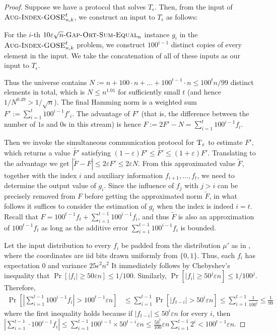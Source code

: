 \documentclass{toc}
\newcommand{\gap}{\ensuremath{\varepsilon}}
\newcommand{\eqdef}{\ensuremath{:=}}
\newcommand{\hest}{ \textsc{T} }
\newcommand{\gose}{\textsc{Gap-Ort-Sum-Equal}}
\newcommand{\auggo}{\textsc{Aug-Index-GOSE}}
\begin{document}
\begin{proof}

{\color{black}Suppose we have a protocol that solves $T_\epsilon$. Then, from the input of $\auggo_{n,k}^t$, we construct an input to $T_\epsilon$ as follows:

For the $i$-th $10\text{$\gap\sqrt{n}$-$\gose_n$}$ instance $g_i$ in the $\auggo_{n,k}^{t}$ problem, we construct $100^{i-1}$ distinct copies of every element in the input. We take the concatenation of all of these inputs as our input to $T_\epsilon$.}
	Thus the universe contains $N\eqdef n+100\cdot n+\dots+100^{t-1}\cdot n \le 100^t n/99$ distinct elements in total, which is $N\le n^{1.01}$ for sufficiently small $t$ (and hence $1/N^{0.49}>1/\sqrt{n}$).
	The final Hamming norm is a weighted sum $F'\eqdef \sum_{i=1}^t 100^{i-1} f'_i$.
	The advantage of $F'$ {\color{black}(that is, the difference between the number of $1$s and $0$s in this stream)} is hence $F \eqdef 2F'-N = \sum_{i=1}^t 100^{i-1} f_i$. 

	Then we invoke the simultaneous communication protocol for $\hest_\gap$ to estimate $F'$, which returns a value $\widetilde{F'}$ satisfying 
	$(1-\gap)F' \le \widetilde{F'} \le (1+\gap)F'$.
	Translating to the advantage we get $\left| \widetilde{F} -  F \right| \le 2\gap F' \le 2\gap N$.
	From this approximated value $\widetilde{F}$, together with the index $i$ and auxiliary information $f_{i+1},\dots, f_t$, we need to determine the output value of $g_i$.
	Since the influence of $f_{j}$ with $j>i$ can be precisely removed from $F$ before getting the approximated norm $\widetilde{F}$, in what follows it suffices to consider the estimation of $g_t$ when the index is indeed $i=t$.
	Recall that $F = 100^{t-1} f_t + \sum_{i=1}^{t-1} 100^{i-1} f_i$,
	and thus $\widetilde{F}$ is also an approximation of $100^{t-1} f_t$ as long as the additive error $\sum_{i=1}^{t-1} 100^{i-1} f_i$ is bounded.

	Let the input distribution to every $f_i$ be padded from the \text{$1$-$\gose_{\epsilon^{-2}}$} distribution $\mu'$ as in , where the coordinates are iid bits drawn uniformly from $\{0,1\}$. Thus, each $f_i$ has expectation $0$ and variance $25\epsilon^2n^2$
	It immediately follows by Chebyshev's inequality that $\Pr\left[|f_i|\ge 50 \gap n\right] \le 1/100$.
	Similarly, $\Pr\left[|f_{i}|\ge 50^j \gap n\right] \le 1/100^j$.
	Therefore,
	\begin{align}
		\Pr\left[ \left|\sum_{i=1}^{t-1} 100^{i-1} f_i \right|>  100^{t-1}\gap n\right] 
		& \le \sum_{i=1}^{t-1} \Pr\left[ \left|f_{t-i}\right| >  50^i \gap n \right]
		\le \sum_{i=1}^{t-1} \frac{1}{100^i} \le \frac{1}{99}
	\end{align}
	where the first inequality holds because if $\left|f_{t-i}\right| \le 50^i \gap n $ for every $i$, then $ \left|\sum_{i=1}^{t-1} \cdot 100^{i-1} f_i \right|\le \sum_{i=1}^{t-1} 100^{i-1}\times 50^{t-i} \gap n\le \frac{50^t}{100}\gap n\sum_{i=1}^{t-1} 2^i < 100^{t-1}\gap n$.


\end{proof}
\end{document}
